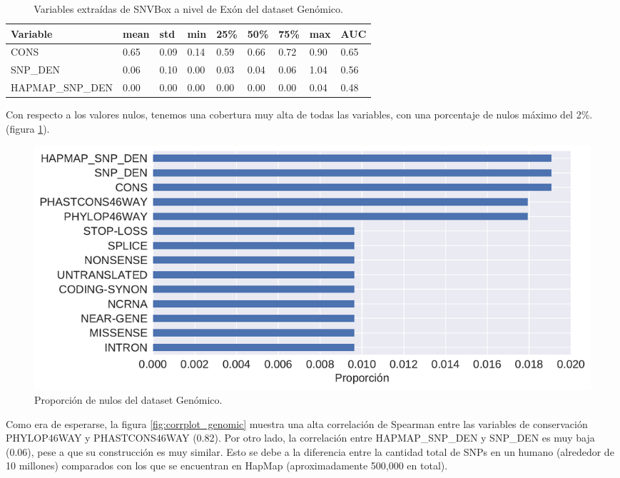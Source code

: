 \begin{table}[H]
\centering
\begin{tabular}{|l|l|l|l|l|l|l|l|l|}
\hline
Variable         & mean & std  & min  & 25\% & 50\% & 75\% & max & AUC  \\ \hline
CONS             & 0.65 & 0.09 & 0.14 & 0.59 & 0.66 & 0.72 & 0.90 & 0.65 \\ \hline
SNP\_DEN         & 0.06 & 0.10 & 0.00 & 0.03 & 0.04 & 0.06 & 1.04 & 0.56 \\ \hline
HAPMAP\_SNP\_DEN & 0.00 & 0.00 & 0.00 & 0.00 & 0.00 & 0.00 & 0.04 & 0.48 \\ \hline
\end{tabular}
\caption{Variables extraídas de SNVBox a nivel de Exón del dataset Genómico.}
\label{snvbox_vars}
\end{table}


Con respecto a los valores nulos, tenemos una cobertura muy alta de todas las variables, con una porcentaje de nulos máximo del 2\%. (figura \ref{fig:proporcion_nulos_genomic}). 



\begin{figure}[H]
    \centering
    \includegraphics[scale=0.6]{documents/latex/figures/3/genomic/proporcion_nulos_genomic.pdf}
    \caption{Proporción de nulos del dataset Genómico.}
    \label{fig:proporcion_nulos_genomic}
\end{figure}

Como era de esperarse, la figura \ref{fig:corrplot_genomic} muestra una alta correlación de Spearman entre las variables de conservación PHYLOP46WAY y PHASTCONS46WAY (0.82). Por otro lado, la correlación entre HAPMAP\_SNP\_DEN y SNP\_DEN es muy baja (0.06), pese a que su construcción es muy similar. Esto se debe a la diferencia entre la cantidad total de SNPs en un humano (alrededor de 10 millones) comparados con los que se encuentran en HapMap (aproximadamente 500,000 en total).

